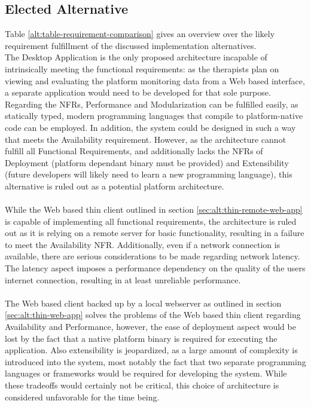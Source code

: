 \subsection{Elected Alternative}
Table \ref{alt:table-requirement-comparison} gives an overview over the likely requirement fulfillment of the discussed implementation alternatives. 
\\
The Desktop Application is the only proposed architecture incapable of intrinsically meeting the functional requirements: as the therapists plan on viewing and evaluating the platform monitoring data from a Web based interface, a separate application would need to be developed for that sole purpose. Regarding the \glspl{NFR}, Performance and Modularization can be fulfilled easily, as statically typed, modern programming languages that compile to platform-native code can be employed. In addition, the system could be designed in such a way that meets the Availability requirement. However, as the architecture cannot fulfill all Functional Requirements, and additionally lacks the \glspl{NFR} of Deployment (platform dependant binary must be provided) and Extensibility (future developers will likely need to learn a new programming language), this alternative is ruled out as a potential platform architecture.
\\\\
While the Web based thin client outlined in section \ref{sec:alt:thin-remote-web-app} is capable of implementing all functional requirements, the architecture is ruled out as it is relying on a remote server for basic functionality, resulting in a failure to meet the Availability \gls{NFR}. Additionally, even if a network connection is available, there are serious considerations to be made regarding network latency. The latency aspect imposes a performance dependency on the quality of the users internet connection, resulting in at least unreliable performance.
\\\\
The Web based client backed up by a local webserver as outlined in section \ref{sec:alt:thin-web-app} solves the problems of the Web based thin client regarding Availability and Performance, however, the ease of deployment aspect would be lost by the fact that a native platform binary is required for executing the application. Also extensibility is jeopardized, as a large amount of complexity is introduced into the system, most notably the fact that two separate programming languages or frameworks would be required for developing the system. While these tradeoffs would certainly not be critical, this choice of architecture is considered unfavorable for the time being.
